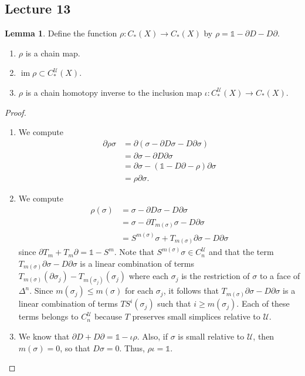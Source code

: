 \documentclass[10pt,letterpaper,cm]{nupset}
\theoremstyle{definition}
\theoremstyle{theorem}
\newtheorem{lemma}[definition]{Lemma}
\theoremstyle{remark}
\newcommand{\U}{\mathcal U}
\newcommand{\1}{\mathbb{1}}
\newcommand{\0}{\vec 0}
\DeclareMathOperator{\im}{im}
\begin{document}
\subsection{Lecture 13}

\begin{lemma} Define the function $\rho : C_{\ast}(X) \to C_{\ast}(X)$ by $\rho = \1 - \partial{D} - D{\partial}$.
\begin{enumerate}
\item $\rho$ is a chain map.
\item $\im{\rho}\subset C_{\ast}^{\U}(X)$. 
\item $\rho$ is a chain homotopy inverse to the inclusion map $\iota : C_{\ast}^{\U}(X) \to C_{\ast}(X)$.
\end{enumerate}
\end{lemma}
\begin{proof} $ $
\begin{enumerate}
\item We compute
\begin{align*}
\partial{\rho{\sigma}} & = \partial(\sigma - \partial{D}{\sigma} - D{\partial}{\sigma})
\\ & = \partial{\sigma} - \partial{D{\partial{\sigma}}}
\\ & = \partial{\sigma} -(\1 -D{\partial} -\rho){\partial{\sigma}}
\\ & = \rho{\partial{\sigma}}.
\end{align*}
\item We compute 
\begin{align*}
\rho(\sigma) & = \sigma - \partial{D}{\sigma} - D{\partial}{\sigma}
\\ & = \sigma - \partial{T_{m(\sigma)}}{\sigma} - D{\partial}{\sigma}
\\ & = S^{m(\sigma)}{\sigma}+T_{m(\sigma)}{\partial{\sigma}} - D{\partial{\sigma}}
\end{align*} since $\partial{T_m} +T_m{\partial} = \1 -S^m$.
Note that $ S^{m(\sigma)}{\sigma} \in C_n^{\U}$ and that the term $T_{m(\sigma)}{\partial{\sigma}} - D{\partial{\sigma}}$ is a linear combination of terms $T_{m(\sigma)}(\partial{\sigma_j}) -T_{m(\sigma_j)}(\sigma_j)$ where each $\sigma_j$  is the restriction of $\sigma$ to a face of $\Delta^n$. Since $m(\sigma_j)\leq m(\sigma)$ for each $\sigma_j$, it follows that $T_{m(\sigma)}{\partial{\sigma}} - D{\partial{\sigma}}$ is a linear combination of terms $TS^i(\sigma_j)$ such that $i\geq m(\sigma_j)$. Each of these terms belongs to $C_n^{\U}$ because $T$ preserves small simplices relative to $\U$.
\item We know that $\partial{D} + D{\partial} =\1 - \iota{\rho}$. Also, if $\sigma$ is small relative to $\U$, then $m(\sigma) =0$, so that $D{\sigma} = 0$. Thus, $\rho{\iota} = \1$.
\end{enumerate}
\end{proof}
\end{document}

